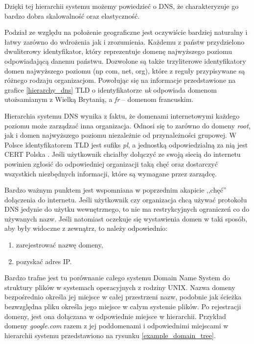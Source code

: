 Dzięki tej hierarchii systemu możemy powiedzieć o DNS, że charakteryzuje go bardzo dobra skalowalność oraz elastyczność.

Podział ze względu na położenie geograficzne jest oczywiście bardziej naturalny i łatwy zarówno do wdrożenia jak i zrozumienia.
Każdemu z państw przydzielono dwuliterowy identyfikator, który reprezentuje domenę najwyższego poziomu odpowiadającą
danemu państwu. Dozwolone są także trzyliterowe identyfikatory domen najwyższego poziomu (np com, net, org), które z reguły
przypisywane są różnego rodzaju organizacjom. Powołując się na informacje przedstawione na grafice \ref{hierarchy_dns}
TLD o identyfikatorze \textit{uk} odpowiada domenom utożsamianym z Wielką Brytanią, a \textit{fr} -- domenom francuskim.

Hierarchia systemu DNS wynika z faktu, że domenami internetowymi każdego poziomu może zarządzać inna organizacja. Odnosi się to
zarówno do domeny \textit{root}, jak i domen najwyższego poziomu niezależnie od przynależności grupowej. W Polsce identyfikatorem
TLD jest sufiks \textit{pl}, a jednostką odpowiedzialną za nią jest CERT Polska \cite{cert}. Jeśli użytkownik chciałby dołączyć
ze swoją siecią do internetu powinien zgłosić do odpowiedniej organizacji taką chęć oraz dostarczyć wszystkich niezbędnych
informacji, które są wymagane przez zarządcę.

Bardzo ważnym punktem jest wspomniana w poprzednim akapicie ,,chęć'' dołączenia do internetu. Jeśli użytkownik czy organizacja
chcą używać protokołu DNS jedynie do użytku wewnętrznego, to nie ma restrykcyjnych ograniczeń co do używanych nazw. Jeśli natomiast
oczekuje się wystawienia domen w taki sposób, aby były widoczne z zewnątrz, to należy odpowiednio:
\begin{enumerate}
	\item zarejestrować nazwę domeny,
	\item pozyskać adres IP.
\end{enumerate}

Bardzo trafne jest tu porównanie całego systemu Domain Name System do struktury plików w systemach operacyjnych z rodziny UNIX.
Nazwa domeny bezpośrednio określa jej miejsce w całej przestrzeni nazw, podobnie jak ścieżka bezwzględna pliku określa jego miejsce
w całym systemie plików. Po rejestracji domeny, jest ona dołączana w odpowiednie miejsce w hierarchii. Przykład domeny \textit{google.com}
razem z jej poddomenami i odpowiednimi miejscami w hierarchii systemu przedstawiono na rysunku \ref{example_domain_tree}.

